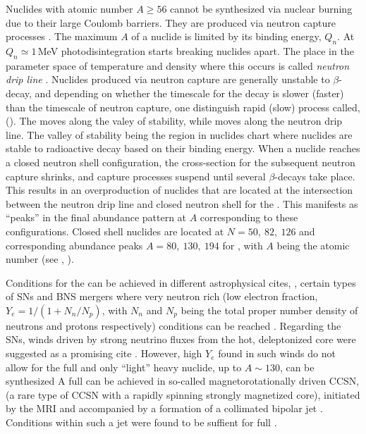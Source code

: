 Nuclides with atomic number  $A\geq 56$ cannot be synthesized via nuclear burning 
due to their large Coulomb barriers. They are produced via 
neutron capture processes \citep{Burbidge:1957}.
The maximum $A$ of a nuclide is limited by its binding energy, $Q_n$. 
At $Q_n \simeq1 \,$MeV photodisintegration starts breaking nuclides apart. 
The place in the parameter space of temperature and density where this occurs 
is called \textit{neutron drip line} \citep{Rolfs:1988}.
Nuclides produced via neutron capture are generally unstable to $\beta$-decay,
and depending on whether the timescale for the decay is slower (faster) than 
the timescale of neutron capture, one distinguish rapid (slow) process called,
\rproc{} (\sproc{}).
%
The \sproc{} moves along the valey of stability, while \rproc{} moves along the 
neutron drip line. The valley of stability being the region in nuclides chart 
where nuclides are stable to radioactive decay based on their binding energy. 
%
When a nuclide reaches a closed neutron shell configuration, the cross-section 
for the subsequent neutron capture shrinks, and capture processes suspend until 
several $\beta$-decays take place. This results in an overproduction of nuclides 
that are located at the intersection between the neutron drip line and closed 
neutron shell for the \rproc{}. This manifests as ``peaks'' in the final abundance 
pattern at $A$ corresponding to these configurations.
Closed shell nuclides are located at $N=50,\: 82, \: 126$ and 
corresponding abundance peaks $A=80,\:130,\:194$ for \rproc{}, 
with $A$ being the atomic number (see \eg, \citet{Arnould:2007gh}).

Conditions for the \rproc{} can be achieved in different astrophysical cites, \eg, 
certain types of \acp{SN} and \ac{BNS} mergers where very neutron rich (low 
electron fraction, $Y_e = 1/(1 + N_n/N_p)$, with $N_n$ and $N_p$ being the 
total proper number density of neutrons and protons respectively) 
conditions can be reached
\citep{Mathews:1990,Thielemann:2011,Lippuner:2015gwa,Siegel:2019mlp}. 
Regarding the \acp{SN}, winds driven by strong neutrino fluxes from the hot, deleptonized
core \citep{Qian:1996xt} were suggested as a promising cite \citep{Woosley:2002,Wanajo:2006mq}.
However, high $Y_e$ found in such winds do not allow for the full \rproc{} and only ``light'' heavy 
nuclide, up to $A\sim130$, can be synthesized 
\citep{Qian:1996xt,Thompson:2001ys,Fischer:2010,Roberts:2010,MartinezPinedo:2012rb,Wanajo:2013} 
%
A full \rproc{} can be achieved in so-called magnetorotationally driven \ac{CCSN},
(a rare type of \ac{CCSN} with a rapidly spinning strongly magnetized core), 
initiated by the \ac{MRI} and accompanied by a %
formation of a 
collimated bipolar jet 
\citep{Wheeler:2000,Akiyama:2003,Burrows:2007yx,Mosta:2014jaa,Mosta:2015,Siegel:2019mlp}.
Conditions within such a jet were found to be suffient for full \rproc{} \nuc{} 
\citep{Winteler:2012,Nishimura:2015nca}.

